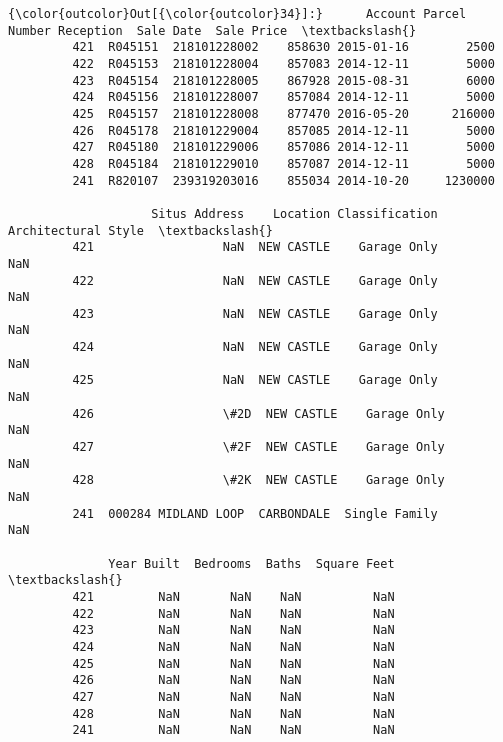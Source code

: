 \documentclass[11pt]{article}
\begin{document}
\begin{Verbatim}[commandchars=\\\{\}]
{\color{outcolor}Out[{\color{outcolor}34}]:}      Account Parcel Number Reception  Sale Date  Sale Price  \textbackslash{}
         421  R045151  218101228002    858630 2015-01-16        2500   
         422  R045153  218101228004    857083 2014-12-11        5000   
         423  R045154  218101228005    867928 2015-08-31        6000   
         424  R045156  218101228007    857084 2014-12-11        5000   
         425  R045157  218101228008    877470 2016-05-20      216000   
         426  R045178  218101229004    857085 2014-12-11        5000   
         427  R045180  218101229006    857086 2014-12-11        5000   
         428  R045184  218101229010    857087 2014-12-11        5000   
         241  R820107  239319203016    855034 2014-10-20     1230000   
         
                    Situs Address    Location Classification Architectural Style  \textbackslash{}
         421                  NaN  NEW CASTLE    Garage Only                 NaN   
         422                  NaN  NEW CASTLE    Garage Only                 NaN   
         423                  NaN  NEW CASTLE    Garage Only                 NaN   
         424                  NaN  NEW CASTLE    Garage Only                 NaN   
         425                  NaN  NEW CASTLE    Garage Only                 NaN   
         426                  \#2D  NEW CASTLE    Garage Only                 NaN   
         427                  \#2F  NEW CASTLE    Garage Only                 NaN   
         428                  \#2K  NEW CASTLE    Garage Only                 NaN   
         241  000284 MIDLAND LOOP  CARBONDALE  Single Family                 NaN   
         
              Year Built  Bedrooms  Baths  Square Feet  \textbackslash{}
         421         NaN       NaN    NaN          NaN   
         422         NaN       NaN    NaN          NaN   
         423         NaN       NaN    NaN          NaN   
         424         NaN       NaN    NaN          NaN   
         425         NaN       NaN    NaN          NaN   
         426         NaN       NaN    NaN          NaN   
         427         NaN       NaN    NaN          NaN   
         428         NaN       NaN    NaN          NaN   
         241         NaN       NaN    NaN          NaN   
         

\end{Verbatim}
\end{document}
